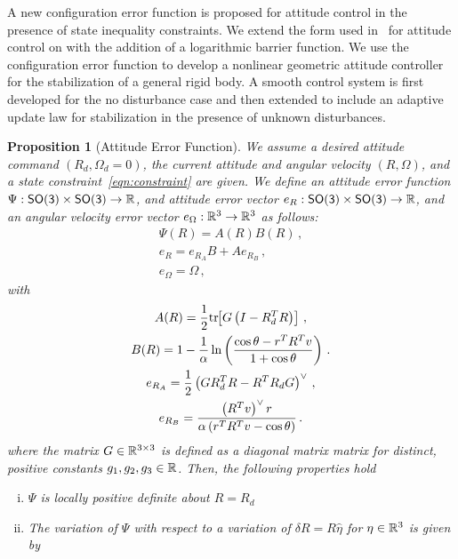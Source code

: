 \documentclass[letterpaper, 10 pt, conference]{ieeeconf}  %
\newtheorem{prop}{Proposition}
\begin{document}
A new configuration error function is proposed for attitude control in the presence of state inequality constraints.
We extend the form used in~\cite{bullo2004,lee2011a} for attitude control on \SO with the addition of a logarithmic barrier function.
We use the configuration error function to develop a nonlinear geometric attitude controller for the stabilization of a general rigid body. 
A smooth control system is first developed for the no disturbance case and then extended to include an adaptive update law for stabilization in the presence of unknown disturbances.

\begin{prop}[Attitude Error Function] \label{prop:config_error}
We assume a desired attitude command \( ( R_d, \Omega_d = 0 ) \), the current attitude and angular velocity \( ( R, \Omega) \), and a state constraint~\cref{eqn:constraint} are given.
We define an attitude error function \( \Psi : \mathsf{SO(3)} \times \mathsf{SO(3)} \to \mathbb{R} \), and attitude error vector \( e_R : \mathsf{SO(3)} \times \mathsf{SO(3)} \to \mathbb{R} \), and an angular velocity error vector \( e_\Omega : \mathbb{R}^3 \to \mathbb{R}^3 \) as follows:
\begin{gather}
	\Psi(R) = A(R) B(R) \, , \label{eqn:psi} \\
	e_R = e_{R_A} B + A e_{R_B} \, , \label{eqn:eR} \\
	e_\Omega = \Omega \, , \label{eqn:eW}
\end{gather}
with
\begin{gather}
	A(R) = \frac{1}{2} \mathrm{tr}\negthickspace\left[ G \left( I - R_d^T R\right) \right] \, , \label{eqn:A} \\
	B(R) = 1 - \frac{1}{\alpha} \ln \left( \frac{\cos \theta -  r^T R^T v}{1 + \cos \theta}\right) \, . \label{eqn:B} \\
	e_{R_A} = \frac{1}{2} \left( G R_d^T R - R^T R_d G \right) ^ \vee \, , \label{eqn:eRA} \\
	e_{R_B} = \frac{ \left( R^T v\right)^\vee r}{\alpha \left(r^T R^T v - \cos \theta \right)} \, . \label{eqn:eRB} 
\end{gather}	
where the matrix \( G \in \mathbb{R}^{3 \times 3} \) is defined as a diagonal matrix matrix for distinct, positive constants \( g_1, g_2, g_3 \in \mathbb{R} \).
Then, the following properties hold
\begin{enumerate}[(i)]
	\item \label{item:prop_psi_psd} \(\Psi\) is locally positive definite about \( R = R_d\)
	\item \label{item:prop_er} The variation of \( \Psi \) with respect to a variation of \( \delta R = R \hat{\eta} \) for \( \eta \in \mathbb{R}^3 \) is given by

\end{enumerate}
\end{prop}
\end{document}
